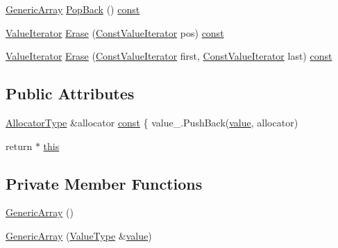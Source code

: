 \begin{DoxyCompactItemize}
\item 
\hyperlink{classGenericArray}{Generic\+Array} \hyperlink{classGenericArray_afd1c75a82d2fc4366cde18256962edf6}{Pop\+Back} () \hyperlink{classGenericArray_a25d2ed55daa117c41db6a5b3f87e9ddc}{const}
\item 
\hyperlink{classGenericArray_afc6ad62c3f00531fa378db266182704a}{Value\+Iterator} \hyperlink{classGenericArray_aefa57a363accf2ade867583771f8a54b}{Erase} (\hyperlink{classGenericArray_a1cd7bb3e75ccfeed3e8b0a6bb5563d68}{Const\+Value\+Iterator} pos) \hyperlink{classGenericArray_a25d2ed55daa117c41db6a5b3f87e9ddc}{const}
\item 
\hyperlink{classGenericArray_afc6ad62c3f00531fa378db266182704a}{Value\+Iterator} \hyperlink{classGenericArray_ac1be0c701ad3aaf0570a8a1ffc715fd5}{Erase} (\hyperlink{classGenericArray_a1cd7bb3e75ccfeed3e8b0a6bb5563d68}{Const\+Value\+Iterator} first, \hyperlink{classGenericArray_a1cd7bb3e75ccfeed3e8b0a6bb5563d68}{Const\+Value\+Iterator} last) \hyperlink{classGenericArray_a25d2ed55daa117c41db6a5b3f87e9ddc}{const}
\end{DoxyCompactItemize}
\subsection*{Public Attributes}
\begin{DoxyCompactItemize}
\item 
\hyperlink{classGenericArray_af9cdc12de03c742b9c33dfc172756b97}{Allocator\+Type} \&allocator \hyperlink{classGenericArray_a25d2ed55daa117c41db6a5b3f87e9ddc}{const} \{ value\+\_\+.\+Push\+Back(\hyperlink{imgui__impl__opengl3__loader_8h_a32aff7c6c4cd253fdf6563677afab5ce}{value}, allocator)
\item 
return $\ast$ \hyperlink{classGenericArray_aef8b7baa9ec5cd68d8951fa8bad85217}{this}
\end{DoxyCompactItemize}
\subsection*{Private Member Functions}
\begin{DoxyCompactItemize}
\item 
\hyperlink{classGenericArray_ab657142e2eb04a6be8e69d51c84c067a}{Generic\+Array} ()
\item 
\hyperlink{classGenericArray_aefb32b089262f573804bea9faa9c6a22}{Generic\+Array} (\hyperlink{classGenericArray_a93e53f38a99fc5167eb2a28653de64ed}{Value\+Type} \&\hyperlink{imgui__impl__opengl3__loader_8h_a32aff7c6c4cd253fdf6563677afab5ce}{value})
\end{DoxyCompactItemize}
